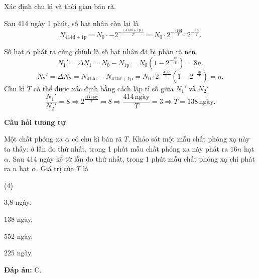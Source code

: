 \begin{dang}{Xác định chu kì và thời gian bán rã.}
{		Sau 414 ngày 1 phút, số hạt nhân còn lại là
		\begin{equation*}
			N_{414\text{d}+1\text{p}}= N_0\cdot -2^{-\frac{(414\text{d}+1\text{p})}{T}}=N_0\cdot 2^{-\frac{414\text{d}}{T}}\cdot 2^{-\frac{1\text{p}}{T}}.
		\end{equation*}
		
		Số hạt $\alpha$ phát ra cũng chính là số hạt nhân đã bị phân rã nên
		\begin{equation*}
			N_1'=\Delta N_1=N_0-N_{1\text{p}}=N_0\left(1- 2^{-\frac{1\text{p}}{T}}\right) = 8n.
		\end{equation*}
		\begin{equation*}
			N_2'=\Delta N_2=N_{414\text{d}}-N_{414\text{d}+1\text{p}}=N_0\cdot 2^{-\frac{414\text{d}}{T}}\left(1- 2^{-\frac{1\text{p}}{T}}\right)=n.
		\end{equation*}
		Chu kì $T$ có thể được xác định bằng cách lập tỉ số giữa $N_1'$ và $N_2'$
		\begin{equation*}
			\dfrac{N_1'}{N_2'}=8\Rightarrow 2^{\frac{414\,\text{ngày}}{T}}=8\Rightarrow \dfrac{414\,\text{ngày}}{T}=3\Rightarrow T= 138\,\text{ngày}.
		\end{equation*}
		
		\begin{center}
			\textbf{Câu hỏi tương tự}
		\end{center}	
		
		Một chất phóng xạ $\alpha$ có chu kì bán rã $T$. Khảo sát một mẫu chất phóng xạ này ta thấy: ở lần đo thứ nhất, trong 1 phút mẫu chất phóng xạ này phát ra $16n$ hạt $\alpha$. Sau 414 ngày kể từ lần đo thứ nhất, trong 1 phút mẫu chất phóng xạ chỉ phát ra $n$ hạt $\alpha$. Giá trị của $T$ là
		\begin{mcq}(4)
			\item 3,8 ngày.
			\item 138 ngày.
			\item 552 ngày.
			\item 225 ngày.
		\end{mcq}
		
		\textbf{Đáp án:} C.
	}
	
\end{dang}
